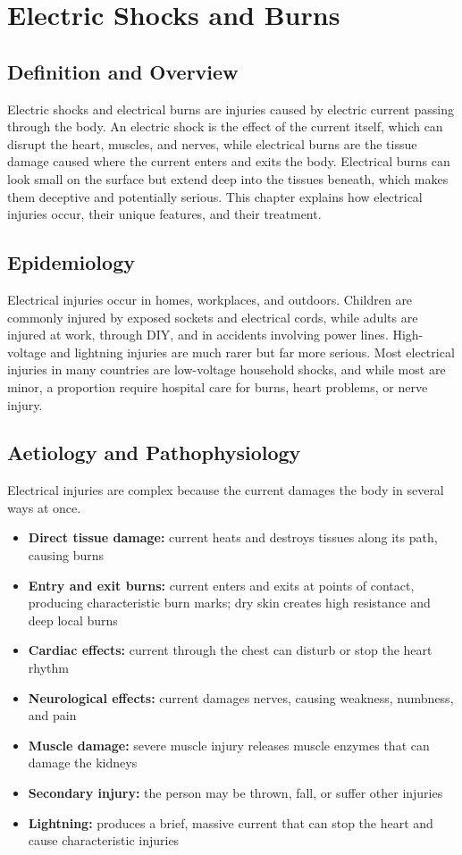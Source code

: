 \chapter{Electric Shocks and Burns}

\section*{Definition and Overview}
Electric shocks and electrical burns are injuries caused by electric current passing through the body. An electric shock is the effect of the current itself, which can disrupt the heart, muscles, and nerves, while electrical burns are the tissue damage caused where the current enters and exits the body. Electrical burns can look small on the surface but extend deep into the tissues beneath, which makes them deceptive and potentially serious. This chapter explains how electrical injuries occur, their unique features, and their treatment.

\section*{Epidemiology}
Electrical injuries occur in homes, workplaces, and outdoors. Children are commonly injured by exposed sockets and electrical cords, while adults are injured at work, through DIY, and in accidents involving power lines. High-voltage and lightning injuries are much rarer but far more serious. Most electrical injuries in many countries are low-voltage household shocks, and while most are minor, a proportion require hospital care for burns, heart problems, or nerve injury.

\section*{Aetiology and Pathophysiology}
Electrical injuries are complex because the current damages the body in several ways at once.
\begin{itemize}
    \item \textbf{Direct tissue damage:} current heats and destroys tissues along its path, causing burns
    \item \textbf{Entry and exit burns:} current enters and exits at points of contact, producing characteristic burn marks; dry skin creates high resistance and deep local burns
    \item \textbf{Cardiac effects:} current through the chest can disturb or stop the heart rhythm
    \item \textbf{Neurological effects:} current damages nerves, causing weakness, numbness, and pain
    \item \textbf{Muscle damage:} severe muscle injury releases muscle enzymes that can damage the kidneys
    \item \textbf{Secondary injury:} the person may be thrown, fall, or suffer other injuries
    \item \textbf{Lightning:} produces a brief, massive current that can stop the heart and cause characteristic injuries
\end{itemize}

